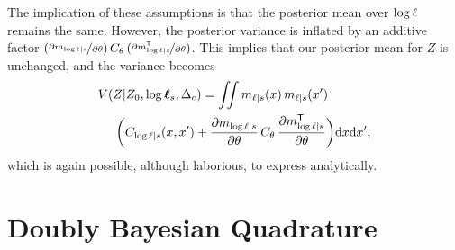 \documentclass{article}
\begin{document}
 
The implication of these assumptions is that the posterior mean over $\tr$ remains the same. However, the posterior variance is inflated by an additive factor
$
(\npderiv{m_{\tr|s}}{\theta})\,C_\theta\,(\npderiv{m\tra_{\tr|s}}{\theta})
$. 
This implies that our posterior mean for $Z$ is unchanged, and the variance becomes
\begin{align*}
  &\cov{\If}{Z_0,\tvr_s,\Delta_c}=
 \iint m_{\lfn|s}(\lfv)\, m_{\lfn|s}(\lfv')\\
&  
\hspace{0.5cm}\biggl(C_{\tr|s}(\lfv,\lfv') + \pderiv{m_{\tr|s}}{\theta}\,C_\theta\,\pderiv{m\tra_{\tr|s}}{\theta}\biggr)
 \ud \lfv \ud\lfv',
\end{align*}
which is again possible, although laborious, to express analytically.



\section{Doubly Bayesian Quadrature}\label{sec:BBQ}
\end{document}
